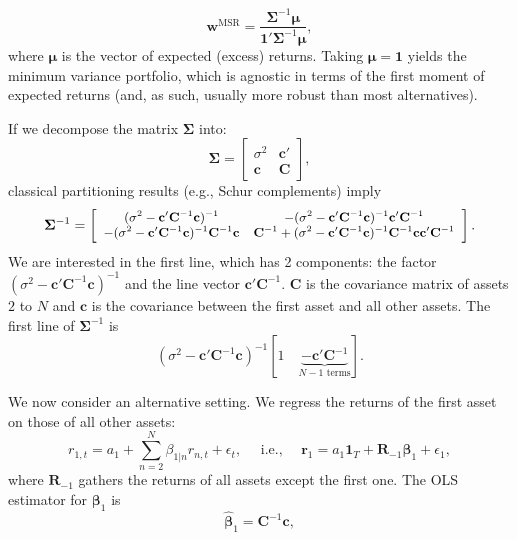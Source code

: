 \documentclass[]{krantz}
\theoremstyle{definition}
\theoremstyle{definition}
\theoremstyle{definition}
\theoremstyle{remark}
\begin{document}
\begin{equation}
\label{eq:MSR}
\mathbf{w}^{\text{MSR}}=\frac{\mathbf{\Sigma}^{-1}\boldsymbol{\mu}}{\mathbf{1}'\mathbf{\Sigma}^{-1}\boldsymbol{\mu}},
\end{equation} where \(\mathbf{\mu}\) is the vector of expected (excess)
returns. Taking \(\mathbf{\mu}=\mathbf{1}\) yields the minimum variance
portfolio, which is agnostic in terms of the first moment of expected
returns (and, as such, usually more robust than most alternatives).

If we decompose the matrix \(\mathbf{\Sigma}\) into:
\[\mathbf{\Sigma}= \left[\begin{array}{cc} \sigma^2 & \mathbf{c}' \\
\mathbf{c}& \mathbf{C}\end{array} \right],\] classical partitioning
results (e.g., Schur complements) imply
\[\small \mathbf{\Sigma}^{-1}= \left[\begin{array}{cc} (\sigma^2 -\mathbf{c}'\mathbf{C}^{-1}\mathbf{c})^{-1} & - (\sigma^2 -\mathbf{c}'\mathbf{C}^{-1}\mathbf{c})^{-1}\mathbf{c}'\mathbf{C}^{-1} \\
- (\sigma^2 -\mathbf{c}'\mathbf{C}^{-1}\mathbf{c})^{-1}\mathbf{C}^{-1}\mathbf{c}& \mathbf{C}^{-1}+ (\sigma^2 -\mathbf{c}'\mathbf{C}^{-1}\mathbf{c})^{-1}\mathbf{C}^{-1}\mathbf{cc}'\mathbf{C}^{-1}\end{array} \right].\]
We are interested in the first line, which has 2 components: the factor
\((\sigma^2 -\mathbf{c}'\mathbf{C}^{-1}\mathbf{c})^{-1}\) and the line
vector \(\mathbf{c}'\mathbf{C}^{-1}\). \(\mathbf{C}\) is the covariance
matrix of assets \(2\) to \(N\) and \(\mathbf{c}\) is the covariance
between the first asset and all other assets. The first line of
\(\mathbf{\Sigma}^{-1}\) is \begin{equation}
\label{eq:sparse1}
(\sigma^2 -\mathbf{c}'\mathbf{C}^{-1}\mathbf{c})^{-1} \left[1 \quad  \underbrace{-\mathbf{c}'\mathbf{C}^{-1}}_{N-1 \text{ terms}} \right]. 
\end{equation}

We now consider an alternative setting. We regress the returns of the
first asset on those of all other assets: \begin{equation}
\label{eq:sparseeq}
r_{1,t}=a_1+\sum_{n=2}^N\beta_{1|n}r_{n,t}+\epsilon_t, \quad \text{ i.e., } \quad  \mathbf{r}_1=a_1\mathbf{1}_T+\mathbf{R}_{-1}\mathbf{\beta}_1+\epsilon_1,
\end{equation} where \(\mathbf{R}_{-1}\) gathers the returns of all
assets except the first one. The OLS estimator for \(\mathbf{\beta}_1\)
is \begin{equation}
\label{eq:sparse2}
\hat{\mathbf{\beta}}_{1}=\mathbf{C}^{-1}\mathbf{c},
\end{equation}
\end{document}
